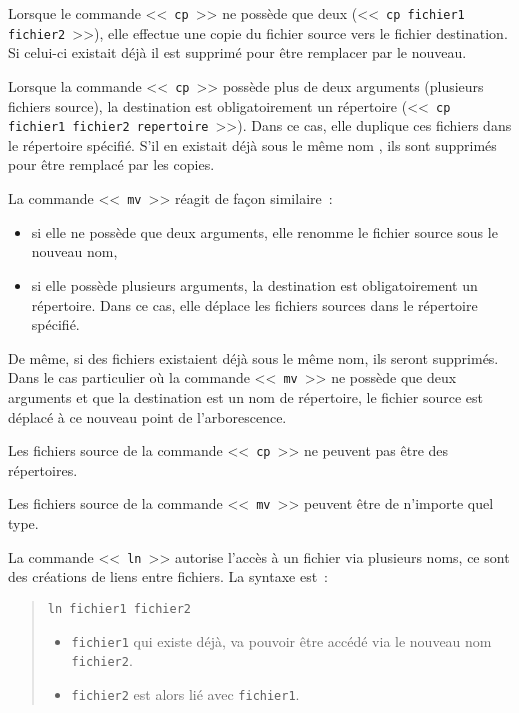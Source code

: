 Lorsque le commande <<~{\tt cp}~>> ne poss{\`e}de que deux (<<~{\tt cp fichier1
fichier2}~>>), elle effectue une copie du fichier source vers le fichier
destination. Si celui-ci existait d{\'e}j{\`a} il est supprim{\'e} pour {\^e}tre
remplacer par le nouveau.

Lorsque la commande <<~{\tt cp}~>> poss{\`e}de plus de deux arguments
(plusieurs fichiers source), la destination est obligatoirement un
r{\'e}pertoire (<<~{\tt cp fichier1 fichier2 repertoire}~>>). Dans ce cas,
elle duplique ces fichiers dans le r{\'e}pertoire sp{\'e}cifi{\'e}. S'il en existait
d{\'e}j{\`a} sous le m{\^e}me nom , ils sont supprim{\'e}s pour {\^e}tre remplac{\'e} par les
copies.

La commande <<~{\tt mv}~>> r{\'e}agit de fa\c{c}on similaire~:
\begin{itemize}
	\item	si elle ne poss{\`e}de que deux arguments, elle renomme le fichier
			source sous le nouveau nom,
	\item	si elle poss{\`e}de plusieurs arguments, la destination est
			obligatoirement un r{\'e}pertoire. Dans ce cas, elle d{\'e}place les
			fichiers sources dans le r{\'e}pertoire sp{\'e}cifi{\'e}.
\end{itemize}

De m{\^e}me, si des fichiers existaient d{\'e}j{\`a} sous le m{\^e}me nom, ils seront
supprim{\'e}s. Dans le cas particulier o{\`u} la commande <<~{\tt mv}~>> ne
poss{\`e}de que deux arguments et que la destination est un nom de
r{\'e}pertoire, le fichier source est d{\'e}plac{\'e} {\`a} ce nouveau point de
l'arborescence.

Les fichiers source de la commande <<~{\tt cp}~>> ne peuvent pas {\^e}tre des
r{\'e}pertoires.

Les fichiers source de la commande <<~{\tt mv}~>> peuvent {\^e}tre de
n'importe quel type.

La commande <<~{\tt ln}~>> autorise l'acc{\`e}s
{\`a} un fichier via plusieurs noms, ce sont des cr{\'e}ations de liens
entre fichiers. La syntaxe est~:
\begin{quote}
\begin{center}
{\tt ln fichier1 fichier2}
\end{center}
\begin{itemize}
	\item {\tt fichier1} qui existe d{\'e}j{\`a}, va pouvoir {\^e}tre acc{\'e}d{\'e} via
		le nouveau nom {\tt fichier2}.
	\item {\tt fichier2} est alors li{\'e} avec {\tt fichier1}.
\end{itemize}
\end{quote}

